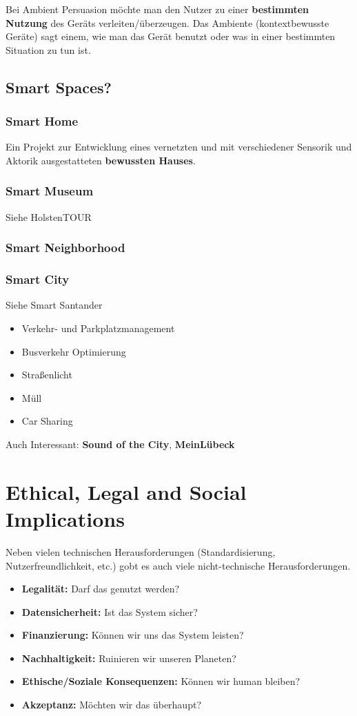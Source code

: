 \documentclass[a4paper]{article}
\begin{document}
Bei Ambient Persuasion möchte man den Nutzer zu einer \textbf{bestimmten Nutzung} des Geräts verleiten/überzeugen. Das Ambiente (kontextbewusste Geräte) sagt einem, wie man das Gerät benutzt oder was in einer bestimmten Situation zu tun ist.
\subsection{Smart Spaces?}
\subsubsection{Smart Home}
Ein Projekt zur Entwicklung eines vernetzten und mit verschiedener Sensorik und Aktorik ausgestatteten \textbf{bewussten Hauses}.
\subsubsection{Smart Museum}
Siehe HolstenTOUR
\subsubsection{Smart Neighborhood}
\subsubsection{Smart City}
Siehe Smart Santander
\begin{itemize}
	\item Verkehr- und Parkplatzmanagement
	\item Busverkehr Optimierung
	\item Straßenlicht
	\item Müll
	\item Car Sharing
\end{itemize}
Auch Interessant: \textbf{Sound of the City}, \textbf{MeinLübeck}

\newpage
\section{Ethical, Legal and Social Implications}
Neben vielen technischen Herausforderungen (Standardisierung, Nutzerfreundlichkeit, etc.) gobt es auch viele nicht-technische Herausforderungen.
\begin{itemize}
	\item \textbf{Legalität:} Darf das genutzt werden?
	\item \textbf{Datensicherheit:} Ist das System sicher?
	\item \textbf{Finanzierung:} Können wir uns das System leisten?
	\item \textbf{Nachhaltigkeit:} Ruinieren wir unseren Planeten?
	\item \textbf{Ethische/Soziale Konsequenzen:} Können wir human bleiben?
	\item \textbf{Akzeptanz:} Möchten wir das überhaupt?
\end{itemize}
\end{document}
